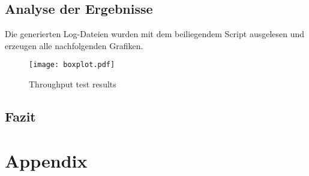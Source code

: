 \documentclass[12pt, a4paper]{scrartcl}
\begin{document}
\subsection{Analyse der Ergebnisse}
Die generierten Log-Dateien wurden mit dem beiliegendem Script ausgelesen und erzeugen alle nachfolgenden Grafiken.

\begin{figure}
    \centering
    \texttt{[image: boxplot.pdf]}
    \caption{Throughput test results}\label{fig::boxres}
\end{figure}

\subsection{Fazit}

\newpage
\renewcommand{\thesubsection}{\Alph{subsection}}
\setcounter{page}{\value{lastroman}}
\section*{Appendix}


\newpage
\listoffigures

\end{document}
